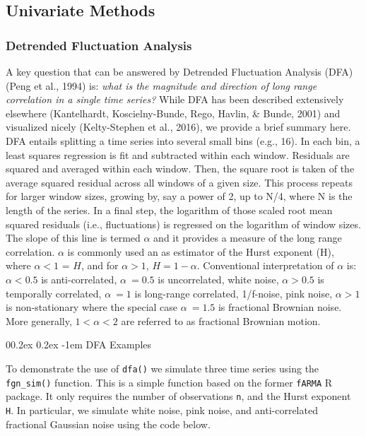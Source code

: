 \documentclass[
  man]{apa6}
\makeatletter
\let\oldparagraph\paragraph
\renewcommand{\paragraph}[1]{\oldparagraph{#1}\mbox{}}
\renewcommand{\paragraph}{\@startsection{paragraph}{4}{\parindent}%
  {0\baselineskip \@plus 0.2ex \@minus 0.2ex}%
  {-1em}%
  {\normalfont\normalsize\bfseries\itshape\typesectitle}}
\makeatother
\begin{document}
\hypertarget{univariate-methods}{%
\subsection{Univariate Methods}\label{univariate-methods}}

\hypertarget{detrended-fluctuation-analysis}{%
\subsubsection{Detrended Fluctuation Analysis}\label{detrended-fluctuation-analysis}}

A key question that can be answered by Detrended Fluctuation Analysis
(DFA) (Peng et al., 1994) is: \emph{what is the magnitude and
direction of long range correlation in a single time series?} While DFA
has been described extensively elsewhere
(Kantelhardt, Koscielny-Bunde, Rego, Havlin, \& Bunde, 2001) and visualized nicely
(Kelty-Stephen et al., 2016), we provide a brief
summary here. DFA entails splitting a time series into several small
bins (e.g., 16). In each bin, a least squares regression is fit and
subtracted within each window. Residuals are squared and averaged within
each window. Then, the square root is taken of the average squared
residual across all windows of a given size. This process repeats for
larger window sizes, growing by, say a power of 2, up to N/4, where N is
the length of the series. In a final step, the logarithm of those scaled
root mean squared residuals (i.e., fluctuations) is regressed on the
logarithm of window sizes. The slope of this line is termed \(\alpha\) and
it provides a measure of the long range correlation. \(\alpha\) is
commonly used an as estimator of the Hurst exponent (H), where
\(\alpha<1\) = \(H\), and for \(\alpha>1\), \(H = 1 - \alpha\). Conventional
interpretation of \(\alpha\) is: \(\alpha < 0.5\) is anti-correlated,
\(\alpha ~= 0.5\) is uncorrelated, white noise, \(\alpha > 0.5\) is
temporally correlated, \(\alpha ~= 1\) is long-range correlated,
1/f-noise, pink noise, \(\alpha > 1\) is non-stationary where the special
case \(\alpha ~= 1.5\) is fractional Brownian noise. More generally,
\(1<\alpha<2\) are referred to as fractional Brownian motion.

\hypertarget{dfa-examples}{%
\paragraph{DFA Examples}\label{dfa-examples}}

To demonstrate the use of \texttt{dfa()} we simulate three time series using
the \texttt{fgn\_sim()} function. This is a simple function based on the former
\texttt{fARMA} R package. It only requires the number of observations \texttt{n}, and
the Hurst exponent \texttt{H}. In particular, we simulate white noise, pink
noise, and anti-correlated fractional Gaussian noise using the code
below.
\end{document}

